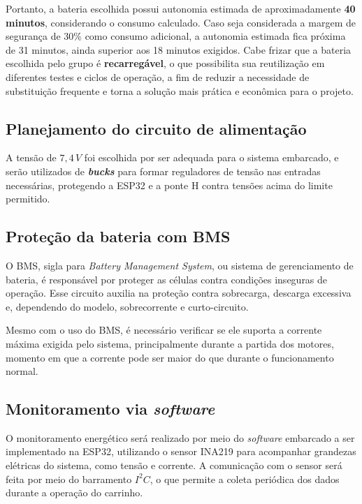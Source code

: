 Portanto, a bateria escolhida possui autonomia estimada de aproximadamente \textbf{40 minutos}, considerando o consumo calculado. Caso seja considerada a margem de segurança de 30\% como consumo adicional, a autonomia estimada fica próxima de 31 minutos, ainda superior aos 18 minutos exigidos. Cabe frizar que a bateria escolhida pelo grupo é \textbf{recarregável}, o que possibilita sua reutilização em diferentes testes e ciclos de operação, a fim de reduzir a necessidade de substituição frequente e torna a solução mais prática e econômica para o projeto.

\subsection{Planejamento do circuito de alimentação}

A tensão de \textbf{$7{,}4\,V$} foi escolhida por ser adequada para o sistema embarcado, e serão utilizados de \textit{\textbf{bucks}} para formar reguladores de tensão nas entradas necessárias, protegendo a ESP32 e a ponte H contra tensões acima do limite permitido.


\subsection{Proteção da bateria com BMS}

O BMS, sigla para \textit{Battery Management System}, ou sistema de gerenciamento de bateria, é responsável por proteger as células contra condições inseguras de operação. Esse circuito auxilia na proteção contra sobrecarga, descarga excessiva e, dependendo do modelo, sobrecorrente e curto-circuito.

Mesmo com o uso do BMS, é necessário verificar se ele suporta a corrente máxima exigida pelo sistema, principalmente durante a partida dos motores, momento em que a corrente pode ser maior do que durante o funcionamento normal.

\subsection{Monitoramento via \textit{software}}

O monitoramento energético será realizado por meio do \textit{software} embarcado a ser implementado na ESP32, utilizando o sensor INA219 para acompanhar grandezas elétricas do sistema, como tensão e corrente. A comunicação com o sensor será feita por meio do barramento $I^2C$, o que permite a coleta periódica dos dados durante a operação do carrinho.

